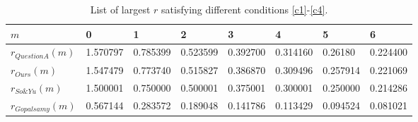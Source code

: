 \documentclass{HZNUMCM}
\begin{document}
\newpage
\begin{table}[!htb]
\begin{small}
\begin{center}
\caption{List of largest $r$ satisfying different conditions \eqref{c1}-\eqref{c4}.}\label{tab1}
\begin{tabular}{l|lllllll}
\hline
$m$&0&1&2&3&4&5&6\\
\hline
 $r_{QuestionA}(m)$&1.570797&0.785399&0.523599&0.392700&0.314160&0.26180&0.224400\\
$r_{Ours}(m)$          &1.547479&0.773740&0.515827&0.386870&0.309496&0.257914&0.221069\\
$r_{So\&Yu}(m)$      &1.500001&0.750000&0.500001&0.375001&0.300001&0.250000&0.214286\\
$r_{Gopalsamy}(m)$&0.567144&0.283572&0.189048&0.141786&0.113429&0.094524&0.081021\\
\hline
\end{tabular}
\end{center}
\end{small}
\end{table}
\newpage
\listoffigures
\newpage
{}

\end{document}
